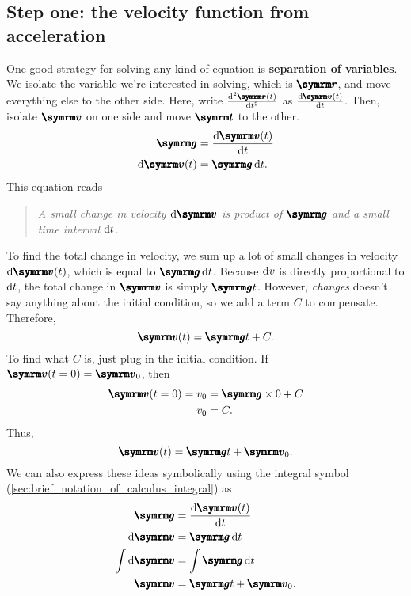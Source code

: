 \subsection{Step one: the velocity function from acceleration}

One good strategy for solving any kind of equation is \textbf{separation of variables}. We isolate the variable we're interested in solving, which is $\vv{r}$, and move everything else to the other side. Here, write $\odv[ord = 2]{\vv{r}(t)}{t}$ as $\odv{\vv{v}(t)}{t}$. Then, isolate $\vv{v}$ on one side and move $\vv{t}$ to the other.
\begin{align}
    \vv{g} &= \odv{\vv{v}(t)}{t} \\
	\odif{\vv{v}}(t) &= \vv{g}\odif{t}.
\end{align}
This equation reads
\begin{quotation}
    \emph{A small change in velocity $\odif{\vv{v}}$ is product of $\vv{g}$ and a small time interval $\odif{t}$.}
\end{quotation}

\begin{multicols}{2}
To find the total change in velocity, we sum up a lot of small changes in velocity $\odif{\vv{v}}(t)$, which is equal to $\vv{g}\odif{t}$. Because $\odif{v}$ is directly proportional to $\odif{t}$, the total change in $\vv{v}$ is simply $\vv{g}t$. However, \emph{changes} doesn't say anything about the initial condition, so we add a term $C$ to compensate. Therefore,
\begin{equation}
    \vv{v}(t) = \vv{g}t + C.
\end{equation}
To find what $C$ is, just plug in the initial condition. If $\vv{v}(t = 0) = \vv{v}_0$, then
\begin{align}
    \vv{v}(t = 0) = v_0 &= \vv{g}\times 0 + C \\
    v_0 &= C.
\end{align}
Thus,
\begin{equation}
    \vv{v}(t) = \vv{g}t + \vv{v}_0.
\end{equation}
We can also express these ideas symbolically using the integral symbol (\cref{sec:brief_notation_of_calculus_integral}) as
\begin{align}
    \vv{g} &= \odv{\vv{v}(t)}{t} \\
    \odif{\vv{v}} &= \vv{g}\odif{t} \\
    \int\odif{\vv{v}} &= \int \vv{g}\odif{t} \\
    \vv{v} &= \vv{g}t + \vv{v}_0. \label{eq:simplemotionr}
\end{align}
\end{multicols}

